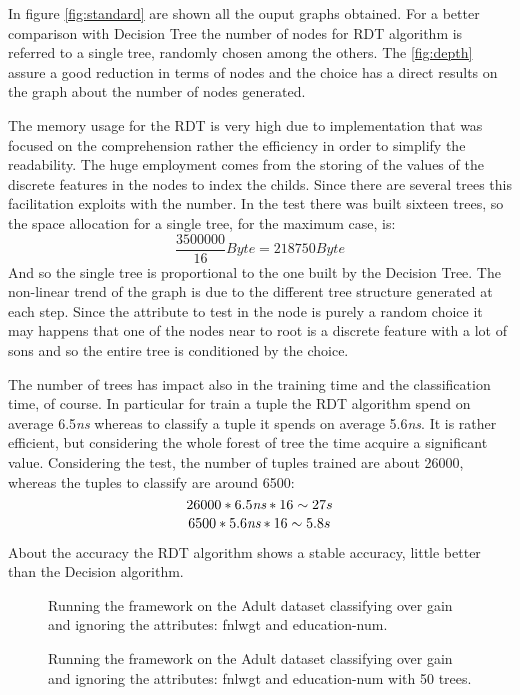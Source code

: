 \documentclass{acm_proc_article-sp-sigmod07}
\begin{document}
In figure \ref{fig:standard} are shown all the ouput graphs obtained. 
For a better comparison with Decision Tree the number of nodes for RDT
algorithm is referred to a single tree, randomly chosen among the others.
The \ref{fig:depth} assure a good reduction in terms of nodes and the
choice has a direct results on the graph about the number of nodes
generated.

The memory usage for the RDT is very high due to implementation that was
focused on the comprehension rather the efficiency in order to simplify
the readability. The huge employment comes from the storing of the
values of the discrete features in the nodes to index the childs. Since
there are several trees this facilitation exploits with the number. In the
test there was built sixteen trees, so the space allocation for a single
tree, for the maximum case, is:
$$ \frac{3500000}{16} Byte = 218750 Byte$$
And so the single tree is proportional to the one built by the Decision
Tree. The non-linear trend of the graph is due to the different tree
structure generated at each step. Since the attribute to test in the node
is purely a random choice it may happens that one of the nodes near to
root is a discrete feature with a lot of sons and so the entire tree is
conditioned by the choice.

The number of trees has impact also in the training time and the
classification time, of course. In particular for train a tuple the RDT
algorithm spend on average 6.5\emph{ns} whereas to classify a tuple it
spends on average 5.6\emph{ns}. It is rather efficient, but considering
the whole forest of tree the time acquire a significant value. Considering
the test, the number of tuples trained are about 26000, whereas the tuples
to classify are around 6500:
$$
26000 * 6.5\emph{ns} * 16 \sim 27 s
$$
$$
 6500 * 5.6\emph{ns} * 16 \sim 5.8 s
$$

About the accuracy the RDT algorithm shows a stable accuracy, little
better than the Decision algorithm.

\begin{figure*}
\label{fig:adult_standard}
\centering
{}
\caption{Running the framework on the Adult dataset classifying over gain
and ignoring the attributes: fnlwgt and education-num.}
\end{figure*}

\begin{figure}
\label{fig:adult_50}
\centering
{}
\caption{Running the framework on the Adult dataset classifying over gain
and ignoring the attributes: fnlwgt and education-num with 50 trees.}
\end{figure}
\end{document}
